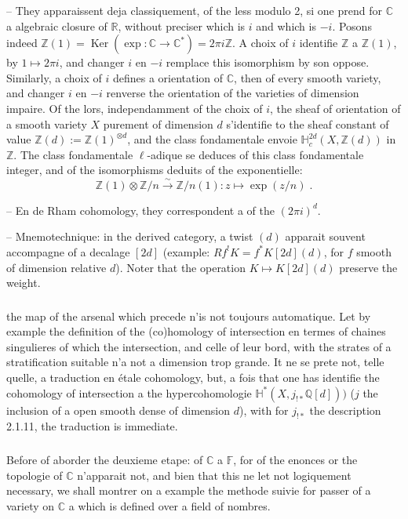 \documentclass[12pt,a4paper]{article}
\theoremstyle{plain}
\theoremstyle{definition}
\theoremstyle{remark}
\DeclareMathOperator{\Ker}{Ker}
\newcommand{\CC}{\mathbb{C}}
\newcommand{\FF}{\mathbb{F}}
\newcommand{\HH}{\mathbb{H}}
\newcommand{\QQ}{\mathbb{Q}}
\newcommand{\RR}{\mathbb{R}}
\newcommand{\ZZ}{\mathbb{Z}}
\begin{document}
-- They apparaissent deja classiquement, of the less modulo 2, si one prend for $\CC$ a algebraic closure of $\RR$, without preciser which is $i$ and which is $-i$. Posons indeed $\ZZ(1) = \Ker(\exp: \CC \to \CC^*) = 2\pi i \ZZ$. A choix of $i$ identifie $\ZZ$ a $\ZZ(1)$, by $1 \longmapsto 2\pi i$, and changer $i$ en $-i$ remplace this isomorphism by son oppose. Similarly, a choix of $i$ defines a orientation of $\CC$, then of every smooth variety, and changer $i$ en $-i$ renverse the orientation of the varieties of dimension impaire. Of the lors, independamment of the choix of $i$, the sheaf of orientation of a smooth variety $X$ purement of dimension $d$ s'identifie to the sheaf constant of value $\ZZ(d) := \ZZ(1)^{\otimes d}$, and the class fondamentale envoie $\HH^{2d}_c(X, \ZZ(d))$ in $\ZZ$. The class fondamentale $\ell$-adique se deduces of this class fondamentale integer, and of the isomorphisms deduits of the exponentielle:
\[
\ZZ(1) \otimes \ZZ/n \xrightarrow{\sim} \ZZ/n(1): z \longmapsto \exp(z/n)\;.
\]

-- En de Rham cohomology, they correspondent a of the $(2\pi i)^d$.

-- Mnemotechnique: in the derived category, a twist $(d)$ apparait souvent accompagne of a decalage $[2d]$ (example: $Rf^!K = f^*K[2d](d)$, for $f$ smooth of dimension relative $d$). Noter that the operation $K \longmapsto K[2d](d)$ preserve the weight.

\subsubsection{}
the map of the arsenal which precede n'is not toujours automatique. Let by example the definition of the (co)homology of intersection en termes of chaines singulieres of which the intersection, and celle of leur bord, with the strates of a stratification suitable n'a not a dimension trop grande. It ne se prete not, telle quelle, a traduction en étale cohomology, but, a fois that one has identifie the cohomology of intersection a the hypercohomologie $\HH^*(X, j_{!*}\QQ[d]))$ ($j$ the inclusion of a open smooth dense of dimension $d$), with for $j_{!*}$ the description 2.1.11, the traduction is immediate.

\subsubsection{}
Before of aborder the deuxieme etape: of $\CC$ a $\FF$, for of the enonces or the topologie of $\CC$ n'apparait not, and bien that this ne let not logiquement necessary, we shall montrer on a example the methode suivie for passer of a variety on $\CC$ a which is defined over a field of nombres.
\end{document}
